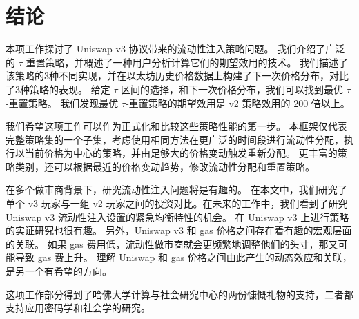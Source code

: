 \documentclass[sigconf, dvipsnames]{acmart}
\begin{document}

\section{结论}\label{sec:conclusion}
\quad 本项工作探讨了 Uniswap v3 协议带来的流动性注入策略问题。
我们介绍了广泛的 $\tau$-重置策略，并概述了一种用户分析计算它们的期望效用的技术。
我们描述了该策略的3种不同实现，并在以太坊历史价格数据上构建了下一次价格分布，对比了3种策略的表现。
给定 $\tau$ 区间的选择，和下一次价格分布，我们可以找到最优 $\tau$-重置策略。
我们发现最优 $\tau$-重置策略的期望效用是 v2 策略效用的 200 倍以上。


%
我们希望这项工作可以作为正式化和比较这些策略性能的第一步。
本框架仅代表完整策略集的一个子集，考虑使用相同方法在更广泛的时间段进行流动性分配，执行以当前价格为中心的策略，并由足够大的价格变动触发重新分配。
更丰富的策略类别，还可以根据最近的价格变动趋势，修改流动性分配和重置策略。

在多个做市商背景下，研究流动性注入问题将是有趣的。
在本文中，我们研究了单个 v3 玩家与一组 v2 玩家之间的投资对比。在未来的工作中，我们看到了研究 Uniswap v3 流动性注入设置的紧急均衡特性的机会。
在 Uniswap v3 上进行策略的实证研究也很有趣。
另外，Uniswap v3 和 gas 价格之间存在着有趣的宏观层面的关联。
如果 gas 费用低，流动性做市商就会更频繁地调整他们的头寸，那又可能导致 gas 费上升。
理解 Uniswap 和 gas 价格之间由此产生的动态效应和关联，是另一个有希望的方向。

\begin{acks}
这项工作部分得到了哈佛大学计算与社会研究中心的两份慷慨礼物的支持，二者都支持应用密码学和社会学的研究。 
\end{acks}



\end{document}
